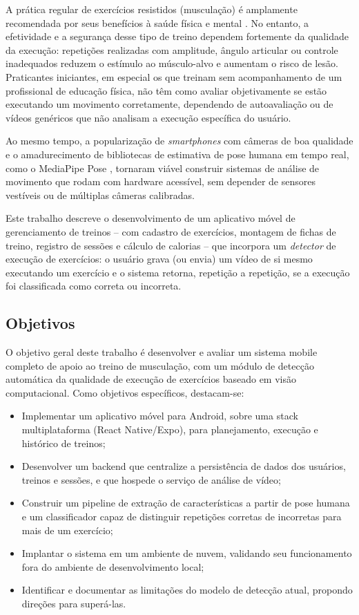 \documentclass[12pt]{article}
\begin{document}
A prática regular de exercícios resistidos (musculação) é amplamente
recomendada por seus benefícios à saúde física e mental
\cite{worldhealth2020}. No entanto, a efetividade e a segurança desse tipo
de treino dependem fortemente da qualidade da execução: repetições
realizadas com amplitude, ângulo articular ou controle inadequados reduzem
o estímulo ao músculo-alvo e aumentam o risco de lesão. Praticantes
iniciantes, em especial os que treinam sem acompanhamento de um
profissional de educação física, não têm como avaliar objetivamente se
estão executando um movimento corretamente, dependendo de autoavaliação ou
de vídeos genéricos que não analisam a execução específica do usuário.

Ao mesmo tempo, a popularização de \textit{smartphones} com câmeras de boa
qualidade e o amadurecimento de bibliotecas de estimativa de pose humana em
tempo real, como o MediaPipe Pose \cite{lugaresi2019mediapipe,
bazarevsky2020blazepose}, tornaram viável construir sistemas de análise de
movimento que rodam com hardware acessível, sem depender de sensores
vestíveis ou de múltiplas câmeras calibradas.

Este trabalho descreve o desenvolvimento de um aplicativo móvel de
gerenciamento de treinos -- com cadastro de exercícios, montagem de fichas
de treino, registro de sessões e cálculo de calorias -- que incorpora um
\textit{detector} de execução de exercícios: o usuário grava (ou envia) um
vídeo de si mesmo executando um exercício e o sistema retorna, repetição a
repetição, se a execução foi classificada como correta ou incorreta.

\subsection{Objetivos}

O objetivo geral deste trabalho é desenvolver e avaliar um sistema mobile
completo de apoio ao treino de musculação, com um módulo de detecção
automática da qualidade de execução de exercícios baseado em visão
computacional. Como objetivos específicos, destacam-se:

\begin{itemize}
  \item Implementar um aplicativo móvel para Android, sobre uma stack
  multiplataforma (React Native/Expo), para planejamento, execução e
  histórico de treinos;
  \item Desenvolver um backend que centralize a persistência de dados dos
  usuários, treinos e sessões, e que hospede o serviço de análise de vídeo;
  \item Construir um pipeline de extração de características a partir de
  pose humana e um classificador capaz de distinguir repetições corretas de
  incorretas para mais de um exercício;
  \item Implantar o sistema em um ambiente de nuvem, validando seu
  funcionamento fora do ambiente de desenvolvimento local;
  \item Identificar e documentar as limitações do modelo de detecção
  atual, propondo direções para superá-las.
\end{itemize}
\end{document}
